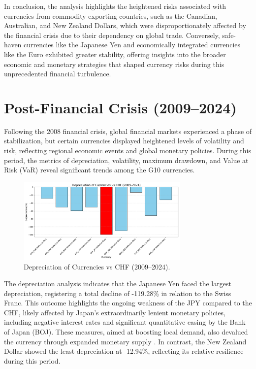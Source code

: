 \documentclass[11pt,a4paper,english,oneside]{book}
\begin{document}
In conclusion, the analysis highlights the heightened risks associated with currencies from commodity-exporting countries, such as the Canadian, Australian, and New Zealand Dollars, which were disproportionately affected by the financial crisis due to their dependency on global trade. Conversely, safe-haven currencies like the Japanese Yen and economically integrated currencies like the Euro exhibited greater stability, offering insights into the broader economic and monetary strategies that shaped currency risks during this unprecedented financial turbulence.

\section{Post-Financial Crisis (2009–2024)}
Following the 2008 financial crisis, global financial markets experienced a phase of stabilization, but certain currencies displayed heightened levels of volatility and risk, reflecting regional economic events and global monetary policies. During this period, the metrics of depreciation, volatility, maximum drawdown, and Value at Risk (VaR) reveal significant trends among the G10 currencies.

\begin{figure}[h!]
    \centering
    \includegraphics[width=0.75\textwidth]{images/depreciation_2009_2024.pdf}
    \caption{Depreciation of Currencies vs CHF (2009--2024).}
    \label{fig:depreciation_2009_2024}
\end{figure}

The depreciation analysis indicates that the Japanese Yen faced the largest depreciation, registering a total decline of -119.28\% in relation to the Swiss Franc. This outcome highlights the ongoing weakness of the JPY compared to the CHF, likely affected by Japan's extraordinarily lenient monetary policies, including negative interest rates and significant quantitative easing by the Bank of Japan (BOJ). These measures, aimed at boosting local demand, also devalued the currency through expanded monetary supply \parencite{shirai2020bank}. In contrast, the New Zealand Dollar showed the least depreciation at -12.94\%, reflecting its relative resilience during this period.
\end{document}

